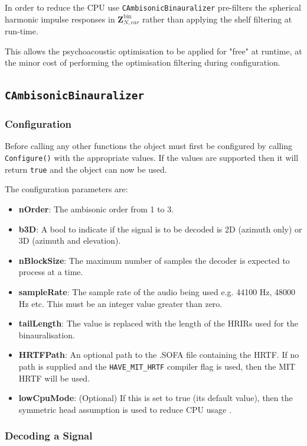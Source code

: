 \documentclass[12pt]{report}
\newcommand{\code}[1]{\texttt{#1}}
\begin{document}
In order to reduce the CPU use \code{CAmbisonicBinauralizer} pre-filters the spherical harmonic impulse responses in $\mathbf{Z}_{N,ear}^{\mathrm{bin}}$ rather than applying the shelf filtering at run-time.

This allows the psychoacoustic optimisation to be applied for "free" at runtime, at the minor cost of performing the optimisation filtering during configuration.

\subsection{\code{CAmbisonicBinauralizer}}

\subsubsection{Configuration}

Before calling any other functions the object must first be configured by calling \code{Configure()} with the appropriate values. If the values are supported then it will return \code{true} and the object can now be used.

The configuration parameters are:
\begin{itemize}
    \item \textbf{nOrder}: The ambisonic order from 1 to 3.
    \item \textbf{b3D}: A bool to indicate if the signal is to be decoded is 2D (azimuth only) or 3D (azimuth and elevation).
    \item \textbf{nBlockSize}: The maximum number of samples the decoder is expected to process at a time.
    \item \textbf{sampleRate}: The sample rate of the audio being used e.g. 44100 Hz, 48000 Hz etc. This must be an integer value greater than zero.
    \item \textbf{tailLength}: The value is replaced with the length of the HRIRs used for the binauralisation.
    \item \textbf{HRTFPath}: An optional path to the .SOFA file containing the HRTF. If no path is supplied and the \code{HAVE\_MIT\_HRTF} compiler flag is used, then the MIT HRTF will be used.
    \item \textbf{lowCpuMode}: (Optional) If this is set to true (its default value), then the symmetric head assumption is used to reduce CPU usage \cite{politis2016jsambisonics}.
\end{itemize}

\subsubsection{Decoding a Signal}
\end{document}
